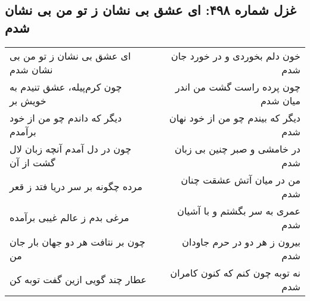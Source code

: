 \begin{center}
\section*{غزل شماره ۴۹۸: ای عشق بی نشان ز تو من بی نشان شدم}
\label{sec:498}
\begin{longtable}{l p{0.5cm} r}
ای عشق بی نشان ز تو من بی نشان شدم
&&
خون دلم بخوردی و در خورد جان شدم
\\
چون کرم‌پیله، عشق تنیدم به خویش بر
&&
چون پرده راست گشت من اندر میان شدم
\\
دیگر که داندم چو من از خود برآمدم
&&
دیگر که بیندم چو من از خود نهان شدم
\\
چون در دل آمدم آنچه زبان لال گشت از آن
&&
در خامشی و صبر چنین بی زبان شدم
\\
مرده چگونه بر سر دریا فتد ز قعر
&&
من در میان آتش عشقت چنان شدم
\\
مرغی بدم ز عالم غیبی برآمده
&&
عمری به سر بگشتم و با آشیان شدم
\\
چون بر نتافت هر دو جهان بار جان من
&&
بیرون ز هر دو در حرم جاودان شدم
\\
عطار چند گویی ازین گفت توبه کن
&&
نه توبه چون کنم که کنون کامران شدم
\\
\end{longtable}
\end{center}
